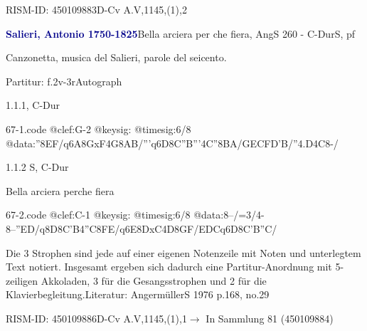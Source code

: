 \documentclass[a4paper, twocolumn, 11pt]{book}
\begin{document}
\newline %
\par RISM-ID: 450109883\newline D-Cv  A.V,1145,(1),2
\par \vspace{16pt} \textcolor{darkblue}{\textbf{Salieri, Antonio  1750-1825}}\hfillplus{[67]}\newline Bella arciera per che fiera, AngS 260 - C-Dur\newline S, pf
\par \begin{itshape} Canzonetta, musica del Salieri, parole del seicento.\end{itshape} 
\par \textcolor{darkblue}{}  Partitur: f.2v-3r\newline Autograph
\par 1.1.1, C-Dur  
\begin{filecontents*}{67-1.code}
@clef:G-2
@keysig:
@timesig:6/8
@data:''8{EF}/q6A{8GxF}4G{8AB}/'''q6D{8C''B}'''4C''{8BA}/{GEC}{FD'B}/''4.D4C8-/
\end{filecontents*}

\newline %
\par 1.1.2  S, C-Dur\newline \begin{footnotesize} Bella arciera perche fiera \end{footnotesize}  
\begin{filecontents*}{67-2.code}
@clef:C-1
@keysig:
@timesig:6/8
@data:8--/=3/4-8--''ED/q8D{8C'B}4''C8FE/q6E{8DxC}4D8GF/{ED}Cq6D{8C'B}''C/
\end{filecontents*}

\newline %
\par Die 3 Strophen sind jede auf einer eigenen Notenzeile mit Noten und unterlegtem Text notiert. Insgesamt ergeben sich dadurch eine Partitur-Anordnung mit 5-zeiligen Akkoladen, 3 für die Gesangsstrophen und 2 für die Klavierbegleitung.\newline Literatur: AngermüllerS 1976  p.168, no.29
\par RISM-ID: 450109886\newline D-Cv  A.V,1145,(1),1\newline $\rightarrow$ In Sammlung 81 (450109884)
      
\end{document}
